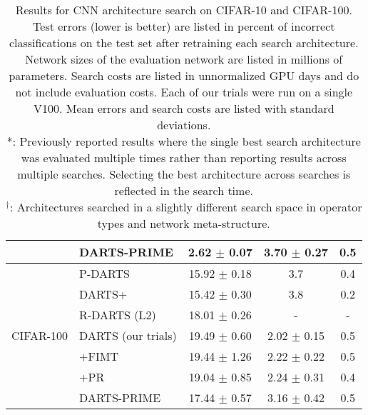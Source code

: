 \documentclass[letterpaper]{article} \usepackage{aaai22}  \usepackage{times}  \usepackage{helvet}  \usepackage{courier}  \usepackage[hyphens]{url}  \usepackage{graphicx} \urlstyle{rm} \def\UrlFont{\rm}  \usepackage{natbib}  \usepackage{caption} \DeclareCaptionStyle{ruled}{labelfont=normalfont,labelsep=colon,strut=off} \frenchspacing  \setlength{\pdfpagewidth}{8.5in}  \setlength{\pdfpageheight}{11in}  \usepackage{algorithm}
\begin{document}
\begin{table*}[t]
\begin{tabular}{@{}clccc@{}}
& DARTS-PRIME & 2.62 $\pm$ 0.07 & 3.70 $\pm$ 0.27 & 0.5 \\
\midrule\midrule
\multirow{7}{*}{CIFAR-100} & P-DARTS \cite{chen2019progressive} & 15.92  $\pm$ 0.18 & 3.7 & 0.4 \\
& DARTS+ \cite{liang2019darts+} & 15.42 $\pm$ 0.30  & 3.8  & 0.2\\
& R-DARTS (L2) \cite{zela2020understanding} & 18.01 $\pm$ 0.26 & - & -\\
 \cmidrule{2-5}
& DARTS (our trials) & 19.49 $\pm$ 0.60 & 2.02 $\pm$ 0.15 & 0.5 \\
& +FIMT & 19.44 $\pm$ 1.26 & 2.22 $\pm$ 0.22 & 0.5 \\
& +PR & 19.04 $\pm$ 0.85 & 2.24 $\pm$ 0.31 & 0.4 \\
& DARTS-PRIME & 17.44 $\pm$ 0.57 & 3.16 $\pm$ 0.42 & 0.5 \\
\bottomrule
\end{tabular}
\caption{Results for CNN architecture search on CIFAR-10 and CIFAR-100. Test errors (lower is better) are listed in percent of incorrect classifications on the test set after retraining each search architecture. Network sizes of the evaluation network are listed in millions of parameters. Search costs are listed in unnormalized GPU days and do not include evaluation costs. Each of our trials were run on a single V100. Mean errors and search costs are listed with standard deviations. \\ 
*: Previously reported results where the single best search architecture was evaluated multiple times rather than reporting results across multiple searches. Selecting the best architecture across searches is reflected in the search time. \\
$^\dagger$: Architectures searched in a slightly different search space in operator types and network meta-structure.
}
\label{table:res}
\end{table*}
\end{document}
